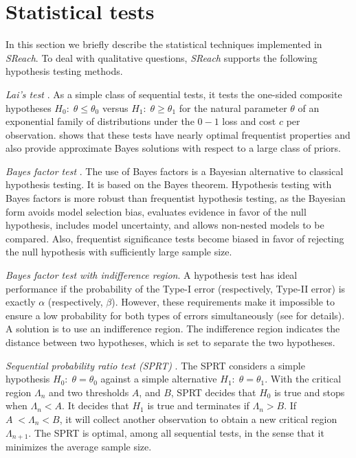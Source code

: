 
\section{Statistical tests}\label{apndx:stat}
In this section we briefly describe the statistical techniques implemented in {\it SReach}.
To deal with qualitative questions, {\it SReach} supports the following hypothesis testing methods.

\textit{Lai's test} \cite{lai1988nearly}.
As a simple class of sequential tests, it tests the one-sided composite hypotheses $H_0: \; \theta \leq \theta_0$ versus $H_1:\; \theta \geq \theta_1$ for the natural parameter $\theta$ of an exponential family of distributions under the $0-1$ loss and cost $c$ per observation. \cite{lai1988nearly} shows that these tests have nearly optimal frequentist properties and also provide approximate Bayes solutions with respect to a large class of priors. 

\textit{Bayes factor test} \cite{kass1995bayes}.
The use of Bayes factors is a Bayesian alternative to classical hypothesis testing. It is based on the Bayes theorem. Hypothesis testing with Bayes factors is more robust than frequentist hypothesis testing, as the Bayesian form avoids model selection bias, evaluates evidence in favor of the null hypothesis, includes model uncertainty, and allows non-nested models to be compared. Also, frequentist significance tests become biased in favor of rejecting the null hypothesis with sufficiently large sample size. 

\textit{Bayes factor test with indifference region}. 
A hypothesis test has ideal performance if the probability of the Type-I error (respectively, Type-II error) is exactly $\alpha$ (respectively, $\beta$). However, these requirements make it impossible to ensure a low probability for both types of errors simultaneously (see \cite{younes2005verification} for details). A solution is to use an indifference region. The indifference region indicates the distance between two hypotheses, which is set to separate the two hypotheses.

\textit{Sequential probability ratio test (SPRT)} \cite{wald1945sequential}. 
The SPRT considers a simple hypothesis $H_0:\;\theta = \theta_0$ against a simple alternative $H_1:\;\theta = \theta_1$. With the critical region $\Lambda_n$ and two thresholds $A$, and $B$, SPRT decides that $H_0$ is true and stops when $\Lambda_n < A$. It decides that $H_1$ is true and terminates if $\Lambda_n > B$. If $A\; < \Lambda_n < B$, it will collect another observation to obtain a new critical region $\Lambda_{n+1}$. The SPRT is optimal, among all sequential tests, in the sense that it minimizes the average sample size.

